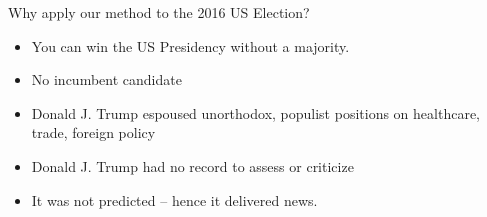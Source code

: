 \documentclass[9pt]{beamer}
\theoremstyle{definition}
\begin{document}
    
    \begin{frame}{Why apply our method to the 2016 US Election?}
    
        \begin{itemize}
            \item You can win the US Presidency without a majority.
            \item No incumbent candidate
            \item Donald J. Trump espoused unorthodox, populist positions on healthcare, trade, foreign policy
            \item Donald J. Trump had no record to assess or criticize
            \item It was not predicted -- hence it delivered news.
        \end{itemize}
        
    \end{frame}
\end{document}
